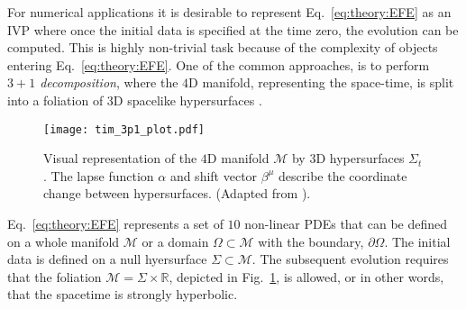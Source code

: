 For numerical applications it is desirable to represent Eq.~\eqref{eq:theory:EFE} 
as an \ac{IVP} where once the initial data is specified at the time zero, 
the evolution can be computed. 
This is highly non-trivial task because of the complexity of objects entering 
Eq.~\eqref{eq:theory:EFE}. One of the common approaches, is to perform 
\textit{$3+1$ decomposition}, where the $4$D manifold, representing the space-time, 
is split into a foliation of $3$D spacelike hypersurfaces 
\citep{Alcubierre:2008,Baumgarte:2010,Gourgoulhon:2007ue,Rezzolla:2013}.


\begin{figure}[t]
    \centering 
    \texttt{[image: tim\_3p1\_plot.pdf]}
    \caption{
        Visual representation of the $4$D manifold $\mathcal{M}$ by $3$D hypersurfaces 
        $\Sigma_t$. The lapse function $\alpha$ and shift vector $\beta^{\mu}$ describe the 
        coordinate change between hypersurfaces.
        (Adapted from \citet{Dietrich:2016phd}).
    }
    \label{fig:theory:3p1}
\end{figure}

Eq.~\eqref{eq:theory:EFE} represents a set of $10$ non-linear \acp{PDE} 
that can be defined on a whole manifold $\mathcal{M}$ or a domain $\Omega\subset\mathcal{M}$ 
with the boundary, $\partial\Omega$.%
%
The initial data is defined on a null hyersurface $\Sigma\subset\mathcal{M}$. 
The subsequent evolution requires that the foliation 
$\mathcal{M}=\Sigma\times\mathbb{R}$, depicted in Fig.~\ref{fig:theory:3p1}, 
is allowed, or in other words, that the spacetime is strongly hyperbolic. 
%



